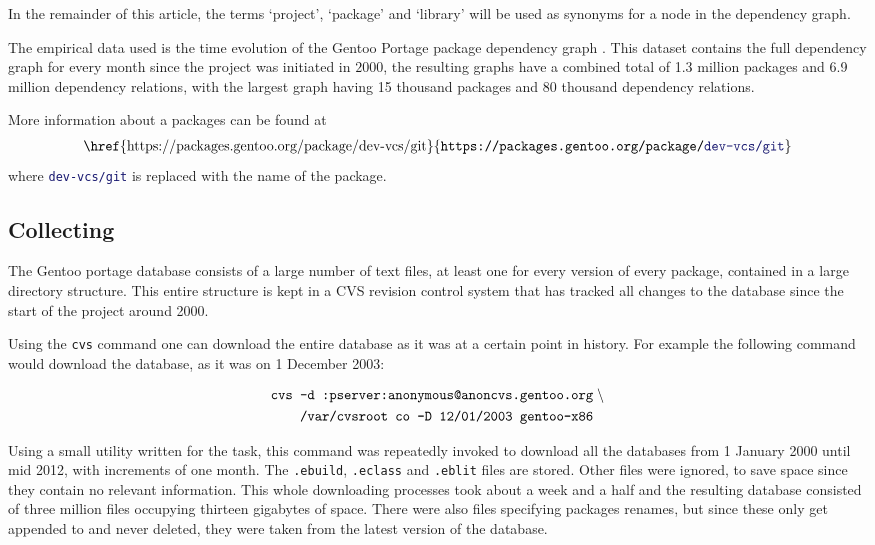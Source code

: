 \documentclass[smallextended,final]{svjour3}
\begin{document}
In the remainder of this article, the terms `project', `package' and `library' will be used as synonyms for a node in the dependency graph.

The empirical data used is the time evolution of the Gentoo Portage package dependency graph \citep{bloemen14b}. This dataset contains the full dependency graph for every month since the project was initiated in $2000$, the resulting graphs have a combined total of 1.3 million packages and 6.9 million dependency relations, with the largest graph having 15 thousand packages and 80 thousand dependency relations.

More information about a packages can be found at
\begin{align}
\mbox{
\href{https://packages.gentoo.org/package/dev-vcs/git}{\texttt{https://packages.gentoo.org/package/\textcolor{MidnightBlue}{dev-vcs/git}}}
}\label{url:pkg}
\end{align}
where \texttt{\textcolor{MidnightBlue}{dev-vcs/git}} is replaced with the name of the package.

\subsection{Collecting}

The Gentoo portage database consists of a large number of text files, at least one for every version of every package, contained in a large directory structure. This entire structure is kept in a CVS revision control system that has tracked all changes to the database since the start of the project around 2000.

Using the \verb|cvs| command one can download the entire database as it was at a certain point in history. For example the following command would download the database, as it was on 1 December 2003:

\begin{align}
\mbox{\texttt{cvs -d :pserver:anonymous@anoncvs.gentoo.org}}&\;\backslash \notag\\
\mbox{\texttt{  /var/cvsroot co -D 12/01/2003 gentoo-x86}}
\label{cmd:cvs}
\end{align}

Using a small utility written for the task, this command was repeatedly invoked to download all the databases from 1 January 2000 until mid 2012, with increments of one month. The \verb|.ebuild|, \verb|.eclass| and \verb|.eblit| files are stored. Other files were ignored, to save space since they contain no relevant information. This whole downloading processes took about a week and a half and the resulting database consisted of three million files occupying thirteen gigabytes of space. There were also files specifying packages renames, but since these only get appended to and never deleted, they were taken from the latest version of the database.
\end{document}
